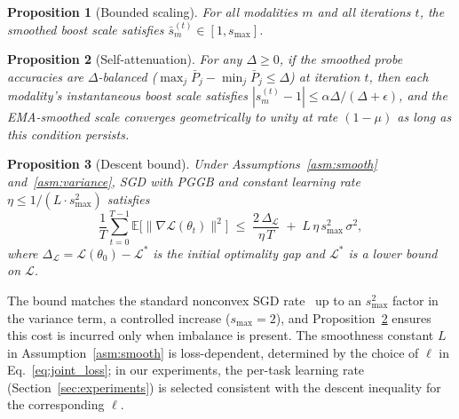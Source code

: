 \documentclass{article}
\newtheorem{proposition}{Proposition}
\newcommand{\loss}{\mathcal{L}}
\begin{document}
\begin{proposition}[Bounded scaling]
\label{prop:bounded}
For all modalities $m$ and all iterations $t$, the smoothed boost scale satisfies $\bar{s}_m^{(t)} \in [1, s_{\max}]$.
\end{proposition}

\begin{proposition}[Self-attenuation]
\label{prop:attenuation}
For any $\Delta \geq 0$, if the smoothed probe accuracies are $\Delta$-balanced ($\max_j \bar{P}_j - \min_j \bar{P}_j \leq \Delta$) at iteration $t$, then each modality's instantaneous boost scale satisfies $|s_m^{(t)} - 1| \leq \alpha \Delta / (\Delta + \epsilon)$, and the EMA-smoothed scale converges geometrically to unity at rate $(1-\mu)$ as long as this condition persists.
\end{proposition}

\begin{proposition}[Descent bound]
\label{prop:convergence}
Under Assumptions~\ref{asm:smooth} and~\ref{asm:variance}, SGD with PGGB and constant learning rate $\eta \leq 1/(L \cdot s_{\max}^2)$ satisfies
%
\begin{equation}
\label{eq:convergence}
\frac{1}{T}\sum_{t=0}^{T-1} \mathbb{E}\bigl[\|\nabla \loss(\theta_t)\|^2\bigr]
\;\leq\; \frac{2\,\Delta_{\loss}}{\eta\, T} \;+\; L\,\eta\, s_{\max}^2\, \sigma^2,
\end{equation}
%
where $\Delta_{\loss} = \loss(\theta_0) - \loss^{*}$ is the initial optimality gap and $\loss^{*}$ is a lower bound on $\loss$.
\end{proposition}

The bound matches the standard nonconvex SGD rate~\citep{ghadimi2013sgd} up to an $s_{\max}^2$ factor in the variance term, a controlled increase ($s_{\max}=2$), and Proposition~\ref{prop:attenuation} ensures this cost is incurred only when imbalance is present. The smoothness constant $L$ in Assumption~\ref{asm:smooth} is loss-dependent, determined by the choice of $\ell$ in Eq.~\eqref{eq:joint_loss}; in our experiments, the per-task learning rate (Section~\ref{sec:experiments}) is selected consistent with the descent inequality for the corresponding $\ell$.
\end{document}
